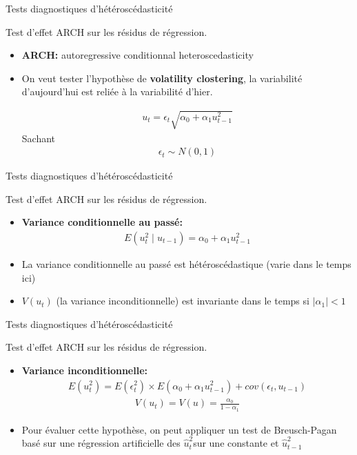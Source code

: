 \documentclass{beamer}
\begin{document}
\begin{frame}{Tests diagnostiques d'hétéroscédasticité}
\begin{block}{Test d’effet ARCH sur les résidus de régression.}
\begin{itemize}
\item \textbf{ARCH:} autoregressive conditionnal heteroscedasticity
\item On veut tester l’hypothèse de \textbf{volatility clostering}, la variabilité d'aujourd’hui est reliée à la variabilité d'hier.

\begin{align*}
u_t = \epsilon_t \sqrt{\alpha_0+\alpha_1 u_{t-1}^2}
\end{align*}
Sachant
\begin{align*}
\epsilon_t \sim N(0,1)
\end{align*}
\end{itemize}
\end{block}
\end{frame}

\begin{frame}{Tests diagnostiques d'hétéroscédasticité}
\begin{block}{Test d’effet ARCH sur les résidus de régression.}
\begin{itemize}
\item \textbf{Variance conditionnelle au passé:}
\begin{align*}
E(u_t^2 \mid u_{t-1})=\alpha_0+\alpha_1 u_{t-1}^2
\end{align*}
\item La variance conditionnelle au passé est hétéroscédastique (varie dans le temps ici)
\item $V(u_t)$ (la variance inconditionnelle) est invariante dans le temps si $\mid \alpha_1 \mid < 1$
\end{itemize}
\end{block}
\end{frame}

\begin{frame}{Tests diagnostiques d'hétéroscédasticité}
\begin{block}{Test d’effet ARCH sur les résidus de régression.}
\begin{itemize}
\item \textbf{Variance inconditionnelle:}
\begin{align*}
E(u_t^2) = E(\epsilon_t^2) \times E(\alpha_0+\alpha_1 u_{t-1}^2)+cov(\epsilon_t,u_{t-1})
\end{align*}
\begin{align*}
V(u_t)=V(u)= \frac{\alpha_0}{1-\alpha_1}
\end{align*}
\item Pour évaluer cette hypothèse, on peut appliquer un test de Breusch-Pagan basé sur une régression artificielle des $\hat{u}_t^2$sur une constante et $\hat{u}_{t-1}^2$
\end{itemize}
\end{block}
\end{frame}
\end{document}
